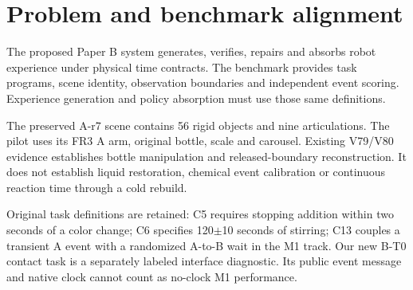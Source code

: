 \documentclass{article}
\begin{document}
\printAffiliationsAndNotice{}
\begin{abstract}
Time-constrained manipulation requires physical effects within the requested
window, rather than timely dispatch alone. We reuse the benchmark's preserved
A-r7 laboratory and execute three uninterrupted native trials for one fixed
contact-timing contract. A public cue requests bilateral finger contact five
seconds later, within 50 milliseconds. The original drive schedule is early;
dispatch at the target is late; anticipation using a previously frozen contact
delay meets the diagnostic window. All three complete the same bottle task.
We preserve raw contacts, states, continuous native clock records and actual
RGB frames. This pilot establishes a robot timing interface and strong baseline,
not neural learning, chemical calibration, hardware timing or benchmark-wide performance.
\end{abstract}

\section{Problem and benchmark alignment}
The proposed Paper B system generates, verifies, repairs and absorbs robot
experience under physical time contracts. The benchmark provides task programs,
scene identity, observation boundaries and independent event scoring. Experience
generation and policy absorption must use those same definitions.

The preserved A-r7 scene contains 56 rigid objects and nine articulations.
The pilot uses its FR3 A arm, original bottle, scale and carousel. Existing
V79/V80 evidence establishes bottle manipulation and released-boundary
reconstruction. It does not establish liquid restoration, chemical event
calibration or continuous reaction time through a cold rebuild.

Original task definitions are retained: C5 requires stopping addition within
two seconds of a color change; C6 specifies 120$\pm$10 seconds of stirring;
C13 couples a transient A event with a randomized A-to-B wait in the M1 track.
Our new B-T0 contact task is a separately labeled interface diagnostic. Its
public event message and native clock cannot count as no-clock M1 performance.
\end{document}
